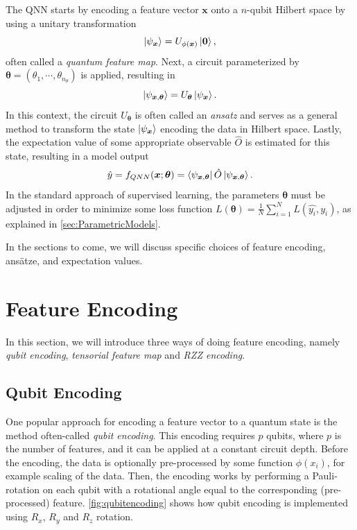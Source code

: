The QNN starts by encoding a feature vector $\boldsymbol{x}$ onto a $n$-qubit Hilbert space by using a unitary transformation 
\begin{equation}
    \ket{\psi_{\boldsymbol{x}}} = U_{\phi(\boldsymbol{x})}\ket{\boldsymbol{0}},
\end{equation}
often called a \emph{quantum feature map}. Next, a circuit parameterized by $\boldsymbol{\theta} = (\theta_1, \cdots, \theta_{n_{\theta}})$ is applied, resulting in 
\begin{equation}
    \ket{\psi_{\boldsymbol{x}, \boldsymbol{\theta}}} = U_{\boldsymbol{\theta}}\ket{\psi_{\boldsymbol{x}}}.
\end{equation} In this context, the circuit $U_{\boldsymbol{\theta}}$ is often called an \emph{ansatz} and serves as a general method to transform the state $\ket{\psi_{\boldsymbol{x}}}$ encoding the data in Hilbert space. Lastly, the expectation value of some appropriate observable $\hat{O}$ is estimated for this state, resulting in a model output 
\begin{equation}\label{eq:QNN}
    \hat{y} = f_{QNN}(\boldsymbol{x};\boldsymbol{\theta}) = \bra{\psi_{\boldsymbol{x}, \boldsymbol{\theta}}} \hat{O} \ket{\psi_{\boldsymbol{x}, \boldsymbol{\theta}}}.
\end{equation} In the standard approach of supervised learning, the parameters $\boldsymbol{\theta}$ must be adjusted in order to minimize some loss function $L(\boldsymbol{\theta}) = \frac{1}{N}\sum_{i=1}^N L(\hat{y_i},y_i)$, as explained in \autoref{sec:ParametricModels}. 

In the sections to come, we will discuss specific choices of feature encoding, ansätze, and expectation values.

\section{Feature Encoding}\label{sec:FeatureEncoding}
In this section, we will introduce three ways of doing feature encoding, namely \emph{qubit encoding}, \emph{tensorial feature map} and \emph{RZZ encoding}. 

\subsection{Qubit Encoding}\label{sec:QubitEncoding}
One popular approach for encoding a feature vector to a quantum state is the method often-called \emph{qubit encoding}\cite{Benedetti_2019}. This encoding requires $p$ qubits, where $p$ is the number of features, and it can be applied at a constant circuit depth. Before the encoding, the data is optionally pre-processed by some function $\phi(x_i)$, for example scaling of the data. Then, the encoding works by performing a Pauli-rotation on each qubit with a rotational angle equal to the corresponding (pre-processed) feature. \autoref{fig:qubitencoding} shows how qubit encoding is implemented using $R_x$, $R_y$ and $R_z$ rotation.

